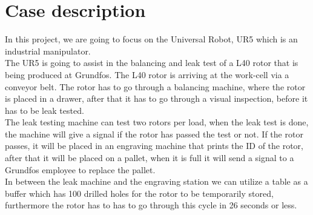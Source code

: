 \section{Case description} \label{ch:case description}

In this project, we are going to focus on the Universal Robot, UR5 which is an industrial manipulator.\\
The UR5 is going to assist in the balancing and leak test of a L40 rotor that is being produced at Grundfos. The L40 rotor is arriving at the work-cell via a conveyor belt. The rotor has to go through a balancing machine, where the rotor is placed in a drawer, after that it has to go through a visual inspection, before it has to be leak tested.\\
The leak testing machine can test two rotors per load, when the leak test is done, the machine will give a signal if the rotor has passed the test or not. If the rotor passes, it will be placed in an engraving machine that prints the ID of the rotor, after that it will be placed on a pallet, when it is full it will send a signal to a Grundfos employee to replace the pallet.\\ 
In between the leak machine and the engraving station we can utilize a table as a buffer which has 100 drilled holes for the rotor to be temporarily stored, furthermore the rotor has to has to go through this cycle in 26 seconds or less.\\

